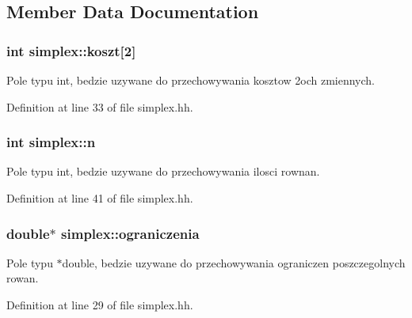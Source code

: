 \subsection{Member Data Documentation}
\hypertarget{classsimplex_adfd1d227f38ea360def13b1f15b20939}{
\subsubsection[{koszt}]{\setlength{\rightskip}{0pt plus 5cm}int simplex\-::koszt\mbox{[}2\mbox{]}\hspace{0.3cm}{\ttfamily [private]}}}\label{classsimplex_adfd1d227f38ea360def13b1f15b20939}


Pole typu int, bedzie uzywane do przechowywania kosztow 2och zmiennych. 



Definition at line 33 of file simplex.\-hh.

\hypertarget{classsimplex_a2345d5a390dc5284e4ed37d5f63ca5e8}{
\subsubsection[{n}]{\setlength{\rightskip}{0pt plus 5cm}int simplex\-::n\hspace{0.3cm}{\ttfamily [private]}}}\label{classsimplex_a2345d5a390dc5284e4ed37d5f63ca5e8}


Pole typu int, bedzie uzywane do przechowywania ilosci rownan. 



Definition at line 41 of file simplex.\-hh.

\hypertarget{classsimplex_a8a31528b6dcde5dadf732e403f2910d1}{
\subsubsection[{ograniczenia}]{\setlength{\rightskip}{0pt plus 5cm}double$\ast$ simplex\-::ograniczenia\hspace{0.3cm}{\ttfamily [private]}}}\label{classsimplex_a8a31528b6dcde5dadf732e403f2910d1}


Pole typu $\ast$double, bedzie uzywane do przechowywania ograniczen poszczegolnych rowan. 



Definition at line 29 of file simplex.\-hh.

